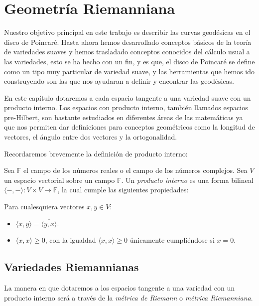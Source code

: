 \chapter{Geometría Riemanniana}\label{Capítulo: Geometría Riemanniana}

Nuestro objetivo principal en este trabajo es describir las curvas geodésicas en el disco de Poincaré. Hasta ahora hemos desarrollado conceptos básicos de la teoría de variedades suaves y hemos trasladado conceptos conocidos del cálculo usual a las variedades, esto se ha hecho con un fin, y es que, el disco de Poincaré se define como un tipo muy particular de variedad suave, y las herramientas que hemos ido construyendo son las que nos ayudaran a definir y encontrar las geodésicas.

En este capítulo dotaremos a cada espacio tangente a una variedad suave con un producto interno. Los espacios con producto interno, también llamados espacios pre-Hilbert, son bastante estudiados en diferentes áreas de las matemáticas ya que nos permiten dar definiciones para conceptos geométricos como la longitud de vectores, el ángulo entre dos vectores y la ortogonalidad.

Recordaremos brevemente la definición de producto interno:

\begin{definition}
	Sea $\mathbb{F}$ el campo de los números reales o el campo de los números complejos. Sea $V$ un espacio vectorial sobre un campo $\mathbb{F}$. Un \textit{producto interno} es una forma bilineal $\langle -,-\rangle: V \times V \to \mathbb{F}$, la cual cumple las siguientes propiedades:

	Para cualesquiera vectores $x,y \in V$:

	\begin{itemize}
		\item $\langle x,y \rangle = \overline{\langle y, x\rangle}$.
		\item $\langle x,x \rangle \geq 0$, con la igualdad $\langle x,x \rangle \geq 0$ únicamente cumpliéndose si $x = 0$.
	\end{itemize}
\end{definition}

\section{Variedades Riemannianas}
La manera en que dotaremos a los espacios tangente a una variedad con un producto interno será a través de la \textit{métrica de Riemann} o \textit{métrica Riemanniana}.

